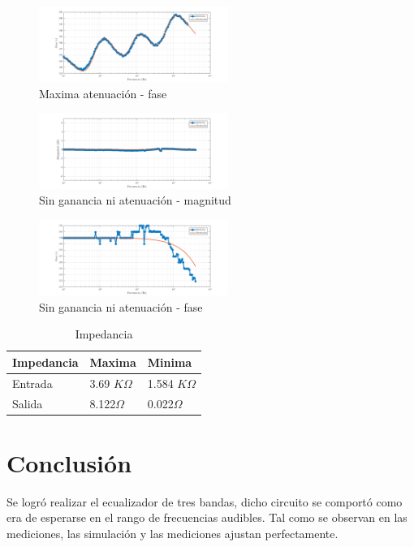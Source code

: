 \documentclass[../../tc_tp3_main.tex]{subfiles}
\begin{document}
\begin{figure}[H]
\centering
\includegraphics[width=0.55\textwidth]{imagenes/min_f.png}
\caption{Maxima atenuación - fase} 
\end{figure}

\begin{figure}[H]
\centering
\includegraphics[width=0.55\textwidth]{imagenes/med_m.png}
\caption{Sin ganancia ni atenuación - magnitud} 
\end{figure}

\begin{figure}[H]
\centering
\includegraphics[width=0.55\textwidth]{imagenes/med_f.png}
\caption{Sin ganancia ni atenuación - fase} 
\end{figure}

\begin{table}[h]
\begin{center}
\begin{tabular}{|l|l|l|}
\hline
Impedancia & Maxima & Minima \\
\hline \hline
Entrada& 3.69 $K \Omega$  &1.584 $K \Omega$ \\ \hline
Salida&8.122$\Omega$  &0.022$\Omega$  \\ \hline


\end{tabular}
\caption{Impedancia} 
\label{tab:MImp}
\end{center}
\end{table}
\section{Conclusión}
Se logró realizar el ecualizador de tres bandas, dicho circuito se comportó como era de esperarse en el rango de frecuencias audibles. Tal como se observan en las mediciones, las simulación y las mediciones ajustan perfectamente.


\end{document}
